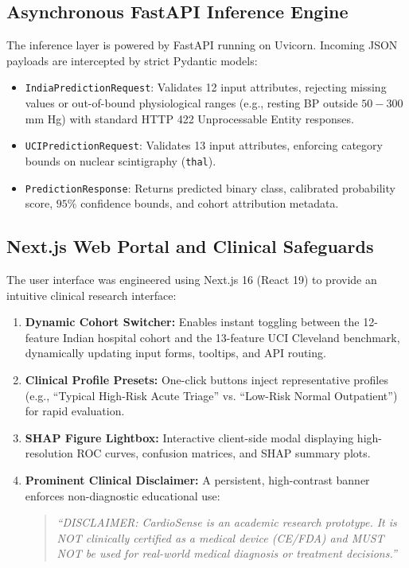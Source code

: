 \documentclass[conference]{IEEEtran}
\begin{document}
\subsection{Asynchronous FastAPI Inference Engine}
The inference layer is powered by FastAPI running on Uvicorn. Incoming JSON payloads are intercepted by strict Pydantic models:
\begin{itemize}
    \item \texttt{IndiaPredictionRequest}: Validates 12 input attributes, rejecting missing values or out-of-bound physiological ranges (e.g., resting BP outside $50 - 300$ mm Hg) with standard HTTP 422 Unprocessable Entity responses.
    \item \texttt{UCIPredictionRequest}: Validates 13 input attributes, enforcing category bounds on nuclear scintigraphy (\texttt{thal}).
    \item \texttt{PredictionResponse}: Returns predicted binary class, calibrated probability score, $95\%$ confidence bounds, and cohort attribution metadata.
\end{itemize}

\subsection{Next.js Web Portal and Clinical Safeguards}
The user interface was engineered using Next.js 16 (React 19) to provide an intuitive clinical research interface:
\begin{enumerate}
    \item \textbf{Dynamic Cohort Switcher:} Enables instant toggling between the 12-feature Indian hospital cohort and the 13-feature UCI Cleveland benchmark, dynamically updating input forms, tooltips, and API routing.
    \item \textbf{Clinical Profile Presets:} One-click buttons inject representative profiles (e.g., ``Typical High-Risk Acute Triage'' vs. ``Low-Risk Normal Outpatient'') for rapid evaluation.
    \item \textbf{SHAP Figure Lightbox:} Interactive client-side modal displaying high-resolution ROC curves, confusion matrices, and SHAP summary plots.
    \item \textbf{Prominent Clinical Disclaimer:} A persistent, high-contrast banner enforces non-diagnostic educational use:
    \begin{quote}
    \textit{``DISCLAIMER: CardioSense is an academic research prototype. It is NOT clinically certified as a medical device (CE/FDA) and MUST NOT be used for real-world medical diagnosis or treatment decisions.''}
    \end{quote}
\end{enumerate}
\end{document}

